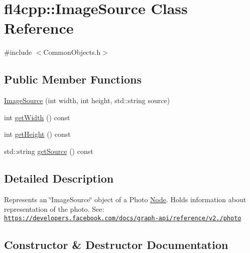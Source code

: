 \hypertarget{classfl4cpp_1_1_image_source}{}\section{fl4cpp\+:\+:Image\+Source Class Reference}
\label{classfl4cpp_1_1_image_source}


{\ttfamily \#include $<$Common\+Objects.\+h$>$}

\subsection*{Public Member Functions}
\begin{DoxyCompactItemize}
\item 
\hyperlink{classfl4cpp_1_1_image_source_ac85e31bc4394f5ea2dcb370648488419}{Image\+Source} (int width, int height, std\+::string source)
\item 
int \hyperlink{classfl4cpp_1_1_image_source_a39c6056fbaa242aa7b2318dbc27d5ccc}{get\+Width} () const 
\item 
int \hyperlink{classfl4cpp_1_1_image_source_a562ba5fc8d03f5379c39886ae24cac80}{get\+Height} () const 
\item 
std\+::string \hyperlink{classfl4cpp_1_1_image_source_a4c42cdd947f2e8da067339fd562850f0}{get\+Source} () const 
\end{DoxyCompactItemize}


\subsection{Detailed Description}
Represents an \char`\"{}\+Image\+Source\char`\"{} object of a Photo \hyperlink{classfl4cpp_1_1_node}{Node}. Holds information about representation of the photo. See\+: \href{https://developers.facebook.com/docs/graph-api/reference/v2.0/photo}{\tt https\+://developers.\+facebook.\+com/docs/graph-\/api/reference/v2./photo} 

\subsection{Constructor \& Destructor Documentation}
